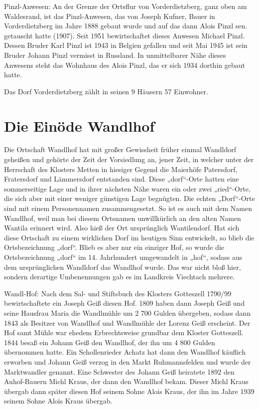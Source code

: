 \documentclass[12pt,a4pager]{book}
\begin{document}
Pinzl-Anwesen: An der Grenze der Ortsflur von Vorderdietzberg, ganz oben am
Waldesrand, ist das Pinzl-Anwesen, das von Joseph Kufner, Bauer in
Vorderdietzberg im Jahre 1888 gebaut wurde und auf das dann Alois Pinzl sen.
getauscht hatte (1907). Seit 1951 bewirtschaftet dieses Anwesen Michael Pinzl.
Dessen Bruder Karl Pinzl ist 1943 in Belgien gefallen und seit Mai 1945 ist sein
Bruder Johann Pinzl vermisst in Russland. In unmittelbarer Nähe dieses Anwesens
steht das Wohnhaus des Alois Pinzl, das er sich 1934 dorthin gebaut hatte.

Das Dorf Vorderdietzberg zählt in seinen 9 Häusern 57 Einwohner.

\section{Die Einöde Wandlhof}

Die Ortschaft Wandlhof hat mit großer Gewissheit früher einmal Wandldorf
geheißen und gehörte der Zeit der Vorsiedlung an, jener Zeit, in welcher unter
der Herrschaft des Klosters Metten in hiesiger Gegend die Maierhöfe Patersdorf,
Fratersdorf und Lämmersdorf entstanden sind. Diese „dorf“-Orte hatten eine
sommerseitige Lage und in ihrer nächsten Nähe waren ein oder zwei „ried“-Orte,
die sich aber mit einer weniger günstigen Lage begnügten. Die echten „Dorf“-Orte
sind mit einem Personennamen zusammengesetzt. So ist es auch mit dem Namen
Wandlhof, weil man bei diesem Ortsnamen unwillkürlich an den alten Namen Wantila
erinnert wird. Also hieß der Ort ursprünglich Wantilendorf. Hat sich diese
Ortschaft zu einem wirklichen Dorf im heutigen Sinn entwickelt, so blieb die
Ortsbezeichnung „dorf“. Blieb es aber nur ein einziger Hof, so wurde die
Ortsbezeichnung „dorf“ im 14. Jahrhundert umgewandelt in „hof“, sodass aus dem
ursprünglichen Wandldorf das Wandlhof wurde. Das war nicht bloß hier, sondern
derartige Umbenennungen gab es im Landkreis Viechtach mehrere.

Wandl-Hof: Nach dem Sal- und Stiftsbuch des Klosters Gotteszell 1790/99
bewirtschaftete ein Joseph Geiß diesen Hof. 1809 haben dann Joseph Geiß und
seine Hausfrau Maria die Wandlmühle um 2 700 Gulden übergeben, sodass dann 1843
als Besitzer von Wandlhof und Wandlmühle der Lorenz Geiß erscheint. Der Hof samt
Mühle war ehedem Erbrechtsweise grundbar dem Kloster Gotteszell. 1844 besaß ein
Johann Geiß den Wandlhof, der ihn um 4 800 Gulden übernommen hatte. Ein
Schollenrieder Achatz hat dann den Wandlhof käuflich erworben und Johann Geiß
verzog in den Markt Ruhmannsfelden und wurde der Marktwandler genannt. Eine
Schwester des Johann Geiß heiratete 1892 den Auhof-Bauern Michl Kraus, der dann
den Wandlhof bekam. Dieser Michl Kraus übergab dann später diesen Hof seinem
Sohne Alois Kraus, der ihn im Jahre 1939 seinem Sohne Alois Kraus übergab.
\end{document}
